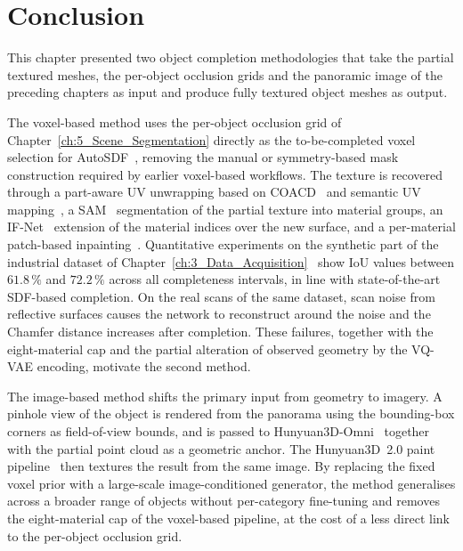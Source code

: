 \section{Conclusion}
\label{sec:7_conclusion}

This chapter presented two object completion methodologies that take the partial textured meshes, the per-object occlusion grids and the panoramic image of the preceding chapters as input and produce fully textured object meshes as output.

The voxel-based method uses the per-object occlusion grid of Chapter~\ref{ch:5_Scene_Segmentation} directly as the to-be-completed voxel selection for AutoSDF~\cite{mittal_autosdf_2022, vermandere_guided_2025}, removing the manual or symmetry-based mask construction required by earlier voxel-based workflows. The texture is recovered through a part-aware UV unwrapping based on \gls{COACD}~\cite{wei_approximate_2022} and semantic UV mapping~\cite{vermandere_semantic_2024}, a SAM~\cite{kirillov_segment_2023} segmentation of the partial texture into material groups, an IF-Net~\cite{chibane_implicit_2021} extension of the material indices over the new surface, and a per-material patch-based inpainting~\cite{efros_image_2001}. Quantitative experiments on the synthetic part of the industrial dataset of Chapter~\ref{ch:3_Data_Acquisition}~\cite{decrocq_voxel_2025} show IoU values between $61.8\,\%$ and $72.2\,\%$ across all completeness intervals, in line with state-of-the-art SDF-based completion. On the real scans of the same dataset, scan noise from reflective surfaces causes the network to reconstruct around the noise and the Chamfer distance increases after completion. These failures, together with the eight-material cap and the partial alteration of observed geometry by the \gls{VQ-VAE} encoding, motivate the second method.

The image-based method shifts the primary input from geometry to imagery. A pinhole view of the object is rendered from the panorama using the bounding-box corners as field-of-view bounds, and is passed to Hunyuan3D-Omni~\cite{hunyuan3d_hunyuan3d-omni_2025} together with the partial point cloud as a geometric anchor. The Hunyuan3D~2.0 paint pipeline~\cite{zhao_hunyuan3d_2025} then textures the result from the same image. By replacing the fixed voxel prior with a large-scale image-conditioned generator, the method generalises across a broader range of objects without per-category fine-tuning and removes the eight-material cap of the voxel-based pipeline, at the cost of a less direct link to the per-object occlusion grid.

